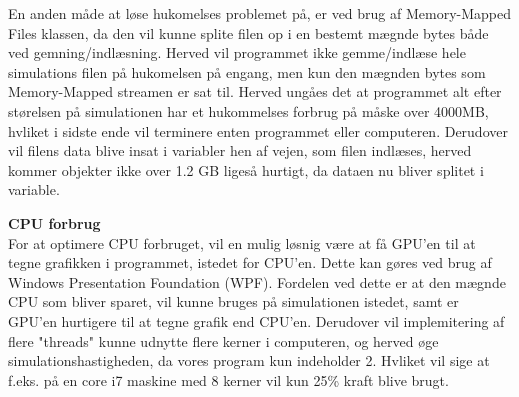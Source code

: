 En anden måde at løse hukomelses problemet på, er ved brug af Memory-Mapped Files klassen, da den vil kunne splite filen op i en bestemt mægnde bytes  både ved gemning/indlæsning. Herved vil programmet ikke gemme/indlæse hele simulations filen på hukomelsen på engang, men kun den mægnden bytes som Memory-Mapped streamen er sat til. Herved ungåes det at programmet alt efter størelsen på simulationen har et hukommelses forbrug på måske over 4000MB, hvliket i sidste ende vil terminere enten programmet eller computeren. Derudover vil filens data blive insat i variabler hen af vejen, som filen indlæses, herved kommer objekter ikke over 1.2 GB ligeså hurtigt, da dataen nu bliver splitet i variable.

\vspace{5mm}

\textbf{CPU forbrug} \\
For at optimere CPU forbruget, vil en mulig løsnig være at få GPU'en til at tegne grafikken i programmet, istedet for CPU'en. Dette kan gøres ved brug af Windows Presentation Foundation (WPF). Fordelen ved dette er at den mægnde CPU som bliver sparet,  vil kunne bruges på simulationen istedet, samt er GPU'en hurtigere til at tegne grafik end CPU'en. Derudover vil implemitering af flere "threads" kunne udnytte flere kerner i computeren, og herved øge simulationshastigheden, da vores program kun indeholder 2. Hvliket vil sige at f.eks. på en core i7 maskine med 8 kerner vil kun 25\% kraft blive brugt.



